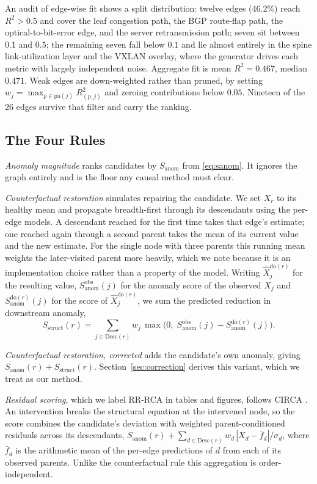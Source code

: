 \documentclass[conference]{IEEEtran}
\begin{document}
An audit of edge-wise fit shows a split distribution: twelve edges (46.2\%) reach $R^2>0.5$ and cover the leaf congestion path, the BGP route-flap path, the optical-to-bit-error edge, and the server retransmission path; seven sit between $0.1$ and $0.5$; the remaining seven fall below $0.1$ and lie almost entirely in the spine link-utilization layer and the VXLAN overlay, where the generator drives each metric with largely independent noise. Aggregate fit is mean $R^2=0.467$, median $0.471$. Weak edges are down-weighted rather than pruned, by setting $w_j=\max_{p\in\mathrm{pa}(j)} R^2_{(p,j)}$ and zeroing contributions below $0.05$. Nineteen of the 26 edges survive that filter and carry the ranking.

\subsection{The Four Rules}
\emph{Anomaly magnitude} ranks candidates by $S_{\mathrm{anom}}$ from \eqref{eq:sanom}. It ignores the graph entirely and is the floor any causal method must clear.

\emph{Counterfactual restoration} simulates repairing the candidate. We set $X_r$ to its healthy mean and propagate breadth-first through its descendants using the per-edge models. A descendant reached for the first time takes that edge's estimate; one reached again through a second parent takes the mean of its current value and the new estimate. For the single node with three parents this running mean weights the later-visited parent more heavily, which we note because it is an implementation choice rather than a property of the model. Writing $\hat{X}_j^{\mathrm{do}(r)}$ for the resulting value, $S_{\mathrm{anom}}^{\mathrm{obs}}(j)$ for the anomaly score of the observed $X_j$ and $S_{\mathrm{anom}}^{\mathrm{do}(r)}(j)$ for the score of $\hat{X}_j^{\mathrm{do}(r)}$, we sum the predicted reduction in downstream anomaly,
\begin{equation}
S_{\mathrm{struct}}(r)=\sum_{j\in \mathrm{Desc}(r)} w_{j}\,
\max\!\bigl(0,\; S_{\mathrm{anom}}^{\mathrm{obs}}(j) - S_{\mathrm{anom}}^{\mathrm{do}(r)}(j)\bigr).
\label{eq:struct-score}
\end{equation}

\emph{Counterfactual restoration, corrected} adds the candidate's own anomaly, giving $S_{\mathrm{anom}}(r)+S_{\mathrm{struct}}(r)$. Section~\ref{sec:correction} derives this variant, which we treat as our method.

\emph{Residual scoring}, which we label RR-RCA in tables and figures, follows CIRCA \cite{li2022circa}. An intervention breaks the structural equation at the intervened node, so the score combines the candidate's deviation with weighted parent-conditioned residuals across its descendants, $S_{\mathrm{anom}}(r)+\sum_{d\in\mathrm{Desc}(r)} w_d\,|X_d-\bar{f}_d|/\sigma_d$, where $\bar{f}_d$ is the arithmetic mean of the per-edge predictions of $d$ from each of its observed parents. Unlike the counterfactual rule this aggregation is order-independent.
\end{document}

